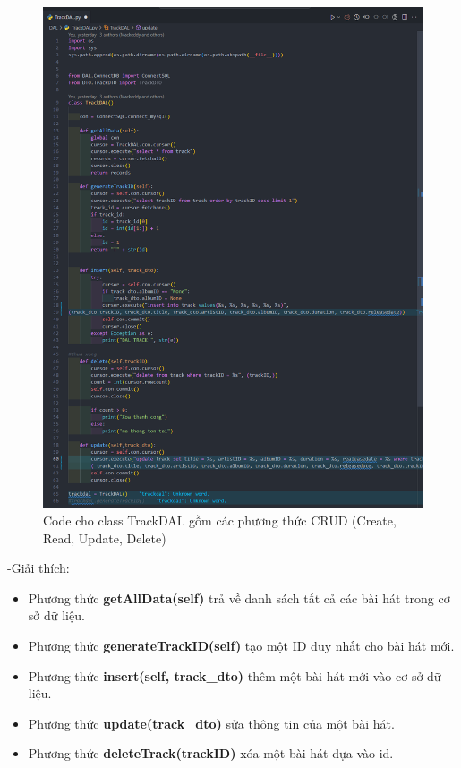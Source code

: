 \documentclass[a4paper]{article}
\begin{document}
\clearpage
\newpage
\begin{figure}[h]
	\centering
	\includegraphics[width=\textwidth]{trackDAl.png}
	\caption{Code cho class TrackDAL gồm các phương thức CRUD (Create, Read, Update, Delete)}
\end{figure}
\clearpage
\newpage
\begin{flushleft}
	-Giải thích:
	\begin{itemize}
		\item Phương thức \textbf{getAllData(self)} trả về danh sách tất cả các bài hát trong cơ sở dữ liệu.

		\item Phương thức \textbf{generateTrackID(self)} tạo một ID duy nhất cho bài hát mới.

		\item Phương thức \textbf{insert(self, track\_dto)} thêm một bài hát mới vào cơ sở dữ liệu.

		\item Phương thức \textbf{update(track\_dto)} sửa thông tin của một bài hát.

		\item Phương thức \textbf{deleteTrack(trackID)} xóa một bài hát dựa vào id.

	\end{itemize}
\end{flushleft}
\clearpage
\end{document}
